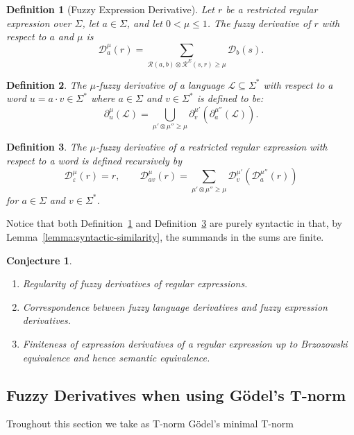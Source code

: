 \documentclass{article}
\def\cut{\mu}
\newtheorem{definition}{Definition}[section]
\newtheorem{conjecture}{Conjecture}[section]
\begin{document}
\begin{definition}[Fuzzy Expression  Derivative]\label{def:regex-fuzzy-derivative}
Let $r$ be a restricted regular expression over $\Sigma$, let $a\in\Sigma$, and let
$0<\cut\le 1$. The \emph{fuzzy derivative} of $r$ with respect to $a$ and
$\cut$ is
\[
  \mathcal D_a^\cut(r)
  =
  \sum_{\mathcal R(a, b)\otimes \mathcal R^{E}( s, r)\geq \mu}
  \mathcal D_b(s).
\]
\end{definition}

\begin{definition}\label{def:fuzzy-word-derivative}
    The $\mu$-fuzzy derivative of a language $\mathcal{L} \subseteq \Sigma^*$ with respect to a word $u=a\cdot v \in \Sigma^*$ where $a \in \Sigma$ and $v \in \Sigma^*$ is defined to be:
    $$
    \partial^\cut_u(\mathcal{L}) = \bigcup_{\cut'\otimes \cut''\geq \cut}\partial^{\cut'}_v(\partial^{\cut''}_a(\mathcal{L})).
    $$
\end{definition}


\begin{definition}\label{def:regex-fuzzy-word-derivative}
The $\mu$-fuzzy derivative of a restricted regular expression with respect to a word is defined
recursively by
\[
  \mathcal D_\varepsilon^\cut(r)=r,
  \qquad
  \mathcal D_{av}^\cut(r)=\sum_{\mu'\otimes\mu''\geq \mu}\mathcal D_v^{\cut'}(\mathcal D_a^{\cut''}(r))
\]
for $a\in\Sigma$ and $v\in\Sigma^*$.
\end{definition}
Notice that both Definition~\ref{def:regex-fuzzy-derivative} and Definition~\ref{def:regex-fuzzy-word-derivative} are purely syntactic in that, by Lemma~\ref{lemma:syntactic-similarity}, the summands in the sums are finite. 
 



\begin{conjecture}\hfill \begin{enumerate}
\item Regularity of fuzzy derivatives of regular expressions.
\item Correspondence between fuzzy language derivatives and fuzzy  expression derivatives.
\item Finiteness of expression derivatives of a regular expression up to Brzozowski equivalence and hence semantic equivalence. 
\end{enumerate}
\end{conjecture}


\subsection{Fuzzy Derivatives when using G\"odel's T-norm}
Troughout this section we take as T-norm G\"odel's minimal T-norm
\end{document}
